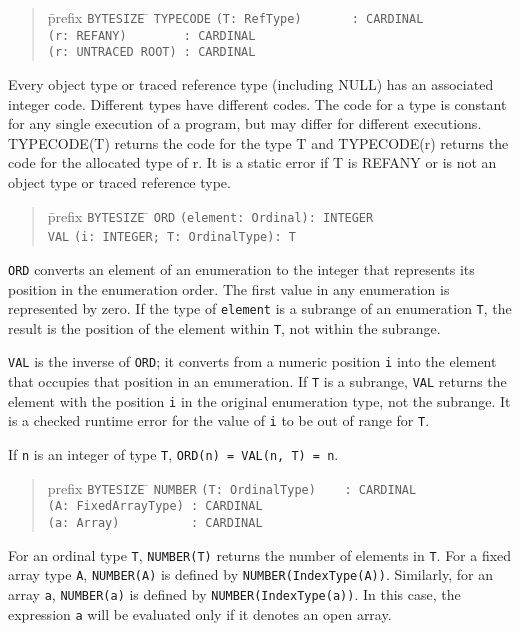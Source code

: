 \documentclass[10pt]{article}
\begin{document}
\begin{quote}
  \begin{tabbing}
    \=prefix \= \verb|BYTESIZE| \= \kill
    \>       \> \verb|TYPECODE| \> \verb|(T: RefType)       : CARDINAL| \\
    \>       \>                 \> \verb|(r: REFANY)        : CARDINAL| \\
    \>       \>                 \> \verb|(r: UNTRACED ROOT) : CARDINAL|
  \end{tabbing}
\end{quote}
Every object type or traced reference type (including NULL) has an associated
integer code.  Different types have different codes.  The code for a type is
constant for any single execution of a program, but may differ for different
executions.  TYPECODE(T) returns the code for the type T and TYPECODE(r)
returns the code for the allocated type of r.  It is a static error if T is
REFANY or is not an object type or traced reference type.

\begin{quote}
  \begin{tabbing}
    \=prefix \= \verb|BYTESIZE| \= \kill
    \>       \> \verb|ORD| \> \verb|(element: Ordinal): INTEGER| \\
    \>       \> \verb|VAL| \> \verb|(i: INTEGER; T: OrdinalType): T|
  \end{tabbing}
\end{quote}
\verb|ORD| converts an element of an enumeration to the integer that
represents its position in the enumeration order.  The first value in any
enumeration is represented by zero.  If the type of \verb|element| is a
subrange of an enumeration \verb|T|, the result is the position of the element
within \verb|T|, not within the subrange.

\verb|VAL| is the inverse of \verb|ORD|; it converts from a numeric position
\verb|i| into the element that occupies that position in an enumeration.  If
\verb|T| is a subrange, \verb|VAL| returns the element with the position
\verb|i| in the original enumeration type, not the subrange.  It is a checked
runtime error for the value of \verb|i| to be out of range for \verb|T|.

If \verb|n| is an integer of type \verb|T|, \verb|ORD(n) = VAL(n, T) = n|.

\begin{quote}
  \begin{tabbing}
    prefix \= \verb|BYTESIZE| \= \kill
           \> \verb|NUMBER| \> \verb|(T: OrdinalType)    : CARDINAL| \\
           \>               \> \verb|(A: FixedArrayType) : CARDINAL| \\
           \>               \> \verb|(a: Array)          : CARDINAL|
  \end{tabbing}
\end{quote}
For an ordinal type \verb|T|, \verb|NUMBER(T)| returns the number of elements
in \verb|T|.  For a fixed array type \verb|A|, \verb|NUMBER(A)| is defined by
\verb|NUMBER(IndexType(A))|.  Similarly, for an array \verb|a|,
\verb|NUMBER(a)| is defined by \verb|NUMBER(IndexType(a))|.  In this case, the
expression \verb|a| will be evaluated only if it denotes an open array.
\end{document}
